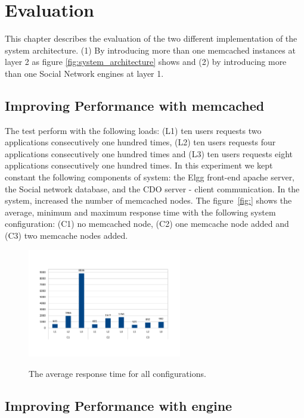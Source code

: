 \chapter{Evaluation}
\label{chapt:evaluation}

This chapter describes the evaluation of the two different implementation of the system architecture. (1) By introducing more than one memcached instances at layer 2 as figure \ref{fig:system_architecture} shows and (2) by introducing more than one Social Network engines at layer 1.

\section{Improving Performance with memcached}
\label{sec:eval_memcache}  
The test perform with the following loads: (L1) ten users requests two applications consecutively one hundred times, (L2) ten users requests four applications consecutively one hundred times and (L3) ten users requests eight applications consecutively one hundred times. In this experiment we kept constant the following components of system: the Elgg front-end apache server, the Social network database, and the CDO server - client communication. In the system, increased the number of memcached nodes.
The figure~\ref{fig:} shows the  average, minimum and maximum response time with the following system configuration: (C1) no memcached node, (C2) one memcache node added and (C3) two memcache nodes added.

\begin{figure}[h]
	\caption{The average response time for all configurations.}
	\includegraphics[width=0.6\textwidth,natwidth=200,natheight=150]{./fig/RTavg.pdf}
	\centering
	\label{fig:rtavg}
\end{figure}
\section{Improving Performance with engine}
